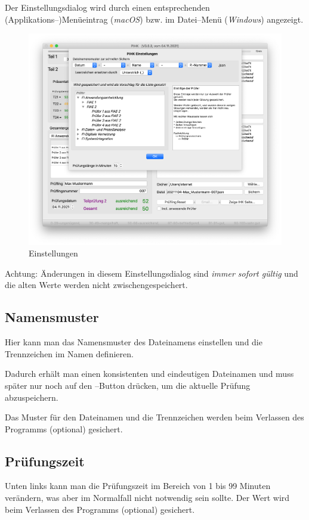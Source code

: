 \documentclass[a4paper,notitlepage,parskip=half]{scrartcl}
\begin{document}
Der Einstellungsdialog wird durch einen entsprechenden (Applikations--)Menüeintrag (\emph{macOS}) bzw. im Datei--Menü (\emph{Windows}) angezeigt.

\begin{figure}[ht]
  \centering
  \includegraphics[width=\textwidth]{Einstellungen.png}
  \caption{Einstellungen}
  \label{fig:einstellungen}
\end{figure}


Achtung: Änderungen in diesem Einstellungsdialog sind \emph{immer sofort gültig} und die alten Werte werden nicht zwischengespeichert.

\subsection{Namensmuster}
Hier kann man das Namensmuster des Dateinamens einstellen und die Trennzeichen im Namen definieren.

Dadurch erhält man einen konsistenten und eindeutigen Dateinamen und muss später nur noch auf den --Button drücken, um die aktuelle Prüfung abzuspeichern.

Das Muster für den Dateinamen und die Trennzeichen werden beim Verlassen des Programms (optional) gesichert.

\subsection{Prüfungszeit}
Unten links kann man die Prüfungszeit im Bereich von 1 bis 99 Minuten verändern, was aber im Normalfall nicht notwendig sein sollte. Der Wert wird beim Verlassen des Programms (optional) gesichert.
\end{document}
